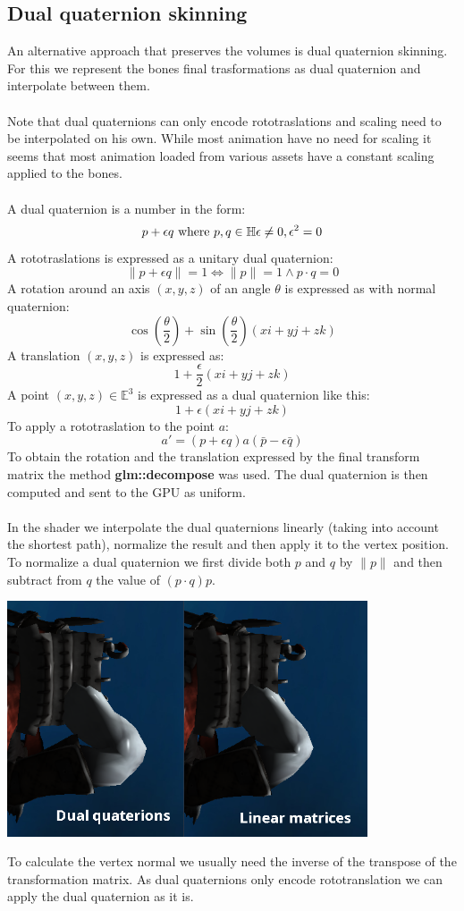 \documentclass[12pt, a4paper]{article}
\begin{document}
\subsection{Dual quaternion skinning}
An alternative approach that preserves the volumes is dual quaternion skinning. For this we represent the bones final trasformations as dual quaternion
and interpolate between them.\\\\
Note that dual quaternions can only encode rototraslations and scaling need to be interpolated on his own. While most animation have no need for scaling
it seems that most animation loaded from various assets have a constant scaling applied to the bones.\\\\
A dual quaternion is a number in the form:
\[
    p + \epsilon q \text{ where } p, q \in \mathbb{H}\\\\
    \epsilon \neq 0, \epsilon^2 = 0
\]
A rototraslations is expressed as a unitary dual quaternion:
\[
    \|p + \epsilon q\| = 1 \iff \|p\| = 1 \land p \cdot q = 0
\]
A rotation around an axis $(x, y, z)$ of an angle $\theta$ is expressed as with normal quaternion:
\[
    \cos(\frac{\theta}{2})+\sin(\frac{\theta}{2})(xi + yj + zk)
\]
A translation $(x, y, z)$ is expressed as:
\[
    1+\frac{\epsilon}{2}(xi + yj + zk)
\]
A point $(x, y, z) \in \mathbb{E}^3$ is expressed as a dual quaternion like this:
\[
    1 + \epsilon (xi +  yj +  zk)
\]
To apply a rototraslation to the point $a$:
\[
    a' = (p + \epsilon q)a(\bar{p} - \epsilon \bar{q})
\]
To obtain the rotation and the translation expressed by the final transform matrix the method \textbf{glm::decompose} was used.
The dual quaternion is then computed and sent to the GPU as uniform.\\\\
In the shader we interpolate the dual quaternions linearly (taking into account the shortest path), normalize the result and then apply it to the vertex position.
To normalize a dual quaternion we first divide both $p$ and $q$ by $\|p\|$ and then subtract from $q$ the value of $(p \cdot q)p$.
\begin{center}
    \centering
    \includegraphics[width=0.8\textwidth]{img/dq.png}
\end{center}
To calculate the vertex normal we usually need the inverse of the transpose of the transformation matrix. As dual quaternions only encode rototranslation
we can apply the dual quaternion as it is.
\end{document}
